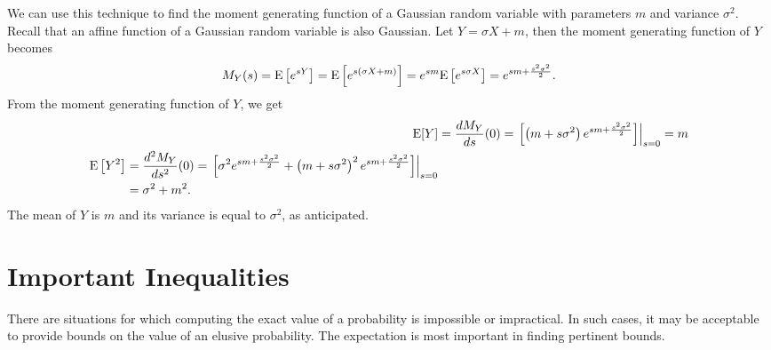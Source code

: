 \begin{example}
We can use this technique to find the moment generating function of a Gaussian random variable with parameters $m$ and variance $\sigma^2$.
Recall that an affine function of a Gaussian random variable is also Gaussian.
Let $Y = \sigma X + m$, then the moment generating function of $Y$ becomes
\begin{equation*}
M_Y (s) = \mathrm{E} \left[ e^{sY} \right]
= \mathrm{E} \left[ e^{s(\sigma X + m)} \right]
= e^{sm} \mathrm{E} \left[ e^{s\sigma X} \right]
= e^{sm + \frac{s^2 \sigma^2}{2} } .
\end{equation*}
From the moment generating function of $Y$, we get
\begin{align*}
\mathrm{E} [Y] &= \frac{d M_Y}{ds} (0)
= \left. \left[ \left(m + s \sigma^2 \right)
e^{sm + \frac{s^2 \sigma^2}{2} } \right] \right|_{s=0} = m \\
\begin{split}
\mathrm{E} \left[ Y^2 \right] &= \frac{d^2 M_Y}{ds^2} (0)
= \left.  \left[ \sigma^2 e^{sm + \frac{s^2 \sigma^2}{2} }
+ \left(m + s \sigma^2 \right)^2  e^{sm + \frac{s^2 \sigma^2}{2} } \right]
\right|_{s=0} \\
&= \sigma^2 + m^2 .
\end{split}
\end{align*}
The mean of $Y$ is $m$ and its variance is equal to $\sigma^2$, as anticipated.
\end{example}


\section{Important Inequalities}

There are situations for which computing the exact value of a probability is impossible or impractical.
In such cases, it may be acceptable to provide bounds on the value of an elusive probability.
The expectation is most important in finding pertinent bounds.

